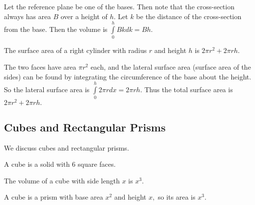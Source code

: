 \begin{pro}
Let the reference plane be one of the bases. Then note that the cross-section always has area $B$ over a height of $h.$ Let $k$ be the distance of the cross-section from the base. Then the volume is $\int\limits_{0}^h Bkdk=Bh.$
\end{pro}

\begin{theo}
The surface area of a right cylinder with radius $r$ and height $h$ is $2\pi r^2+2\pi rh.$
\end{theo}

\begin{pro}
The two faces have area $\pi r^2$ each, and the lateral surface area (surface area of the sides) can be found by integrating the circumference of the base about the height. So the lateral surface area is $\int\limits_0^h 2\pi rdx=2\pi rh.$ Thus the total surface area is $2\pi r^2+2\pi rh.$
\end{pro}

\subsection{Cubes and Rectangular Prisms}

We discuss cubes and rectangular prisms.

\begin{defi}[Cube]
A cube is a solid with $6$ square faces.
\begin{center}
\end{center}
\end{defi}

\begin{theo}
The volume of a cube with side length $x$ is $x^3.$
\end{theo}

\begin{pro}
A cube is a prism with base area $x^2$ and height $x,$ so its area is $x^3.$
\end{pro}

